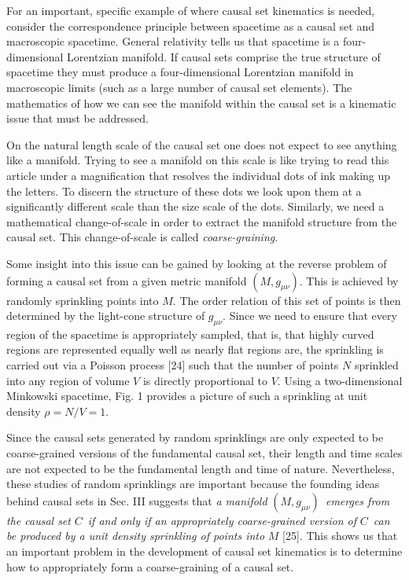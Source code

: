 For an important, specific example of where causal set kinematics is needed,
consider the correspondence principle between spacetime as a causal set and
macroscopic spacetime. General relativity tells us that spacetime is a
four-dimensional Lorentzian manifold. If causal sets comprise the true
structure of spacetime they must produce a four-dimensional Lorentzian
manifold in macroscopic limits (such as a large number of causal set
elements). The mathematics of how we can see the manifold within the causal
set is a kinematic issue that must be addressed.

On the natural length scale of the causal set one does not expect to see
anything like a manifold. Trying to see a manifold on this scale is like
trying to read this article under a magnification that resolves the
individual dots of ink making up the letters. To discern the structure of
these dots we look upon them at a significantly different scale than the
size scale of the dots. Similarly, we need a mathematical change-of-scale in
order to extract the manifold structure from the causal set. This
change-of-scale is called {\it coarse-graining}.

Some insight into this issue can be gained by looking at the reverse problem
of forming a causal set from a given metric manifold $(M,g_{\mu \nu })$.
This is achieved by randomly sprinkling points into $M$. The order relation
of this set of points is then determined by the light-cone structure of $%
g_{\mu \nu }$. Since we need to ensure that every region of the spacetime is
appropriately sampled, that is, that highly curved regions are represented
equally well as nearly flat regions are, the sprinkling is carried out via a
Poisson process [24] such that the number of points $N$ sprinkled into any
region of volume $V$ is directly proportional to $V$. Using a
two-dimensional Minkowski spacetime, Fig. 1 provides a picture of such a
sprinkling at unit density $\rho =N/V=1$.

Since the causal sets generated by random sprinklings are only expected to
be coarse-grained versions of the fundamental causal set, their length and
time scales are not expected to be the fundamental length and time of
nature. Nevertheless, these studies of random sprinklings are important
because the founding ideas behind causal sets in Sec. III suggests that {\it %
a manifold }$(M,g_{\mu \nu })${\it \ emerges from the causal set }$C${\it \
if and only if an appropriately coarse-grained version of }$C${\it \ can be
produced by a unit density sprinkling of points into }$M$ [25]. This shows
us that an important problem in the development of causal set kinematics is
to determine how to appropriately form a coarse-graining of a causal set.

